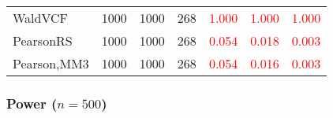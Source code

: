 \documentclass[
]{article}
\begin{document}
\begin{table}[H]
{\begin{tabular}[t]{lrrrrrr}
\hspace{1em}WaldVCF & 1000 & 1000 & 268 & \textcolor{red}{1.000} & \textcolor{red}{1.000} & \textcolor{red}{1.000}\\
\hspace{1em}PearsonRS & 1000 & 1000 & 268 & \textcolor{red}{0.054} & \textcolor{red}{0.018} & \textcolor{red}{0.003}\\
\hspace{1em}Pearson,MM3 & 1000 & 1000 & 268 & \textcolor{red}{0.054} & \textcolor{red}{0.016} & \textcolor{red}{0.003}\\
\bottomrule
\end{tabular}}
\endgroup{}
\end{table}

\hypertarget{power-n500-3}{%
\subsubsection{\texorpdfstring{Power
(\(n=500\))}{Power (n=500)}}\label{power-n500-3}}
\end{document}
